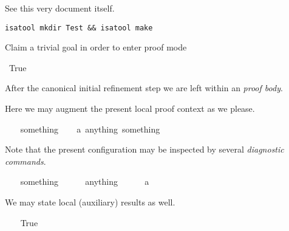 \begin{isabellebody}
%
\isamarkuptrue%
%
\isamarkuptrue%
%
\isamarkuptrue%
%
\isamarkuptrue%
%
\isamarkuptrue%
%
\begin{isamarkuptext}%
See this very document itself.%
\end{isamarkuptext}%
\isamarkuptrue%
%
\isamarkuptrue%
%
\begin{isamarkuptext}%
\verb"isatool mkdir Test && isatool make"%
\end{isamarkuptext}%
\isamarkuptrue%
%
\isamarkuptrue%
%
\isamarkuptrue%
%
\begin{isamarkuptext}%
Claim a trivial goal in order to enter proof mode \isa{{\isasymdots}}%
\end{isamarkuptext}%
\isamarkuptrue%
\ True\isanewline
\isamarkupfalse%
\isamarkupfalse%
%
\begin{isamarkuptxt}%
After the canonical initial refinement step we are left
    within an \emph{proof body}.%
\end{isamarkuptxt}%
\isamarkuptrue%
%
\begin{isamarkuptxt}%
Here we may augment the present local {proof context} as we
    please.%
\end{isamarkuptxt}%
\ \ \isamarkuptrue%
\ something\isanewline
\ \ \isamarkupfalse%
\ a{\isacharcolon}\ {\isachardoublequote}anything\ something{\isachardoublequote}\isamarkupfalse%
%
\begin{isamarkuptxt}%
Note that the present configuration may be inspected by
  several \emph{diagnostic commands}.%
\end{isamarkuptxt}%
\ \ \isamarkuptrue%
\ something\ \ %
\isanewline
\ \ \isamarkupfalse%
\ anything\ \ %
\isanewline
\ \ \isamarkupfalse%
\ a\ \ %
\isamarkupfalse%
%
\begin{isamarkuptxt}%
We may state local (auxiliary) results as well.%
\end{isamarkuptxt}%
\ \ \isamarkuptrue%
\ True\ \isamarkupfalse%

\end{isabellebody}
